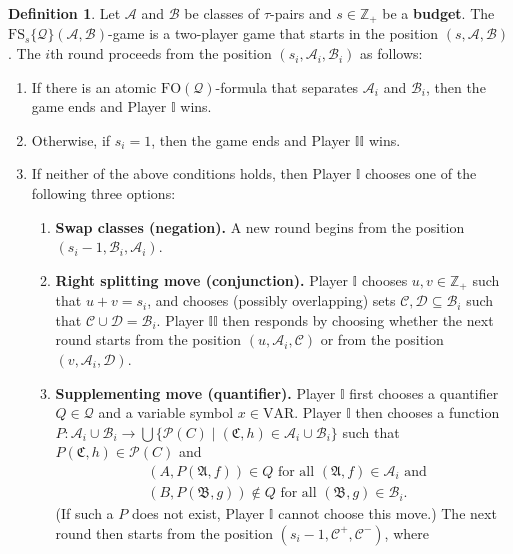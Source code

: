 \documentclass{article}
\theoremstyle{definition}
\newtheorem{definition}[theorem]{Definition}
\begin{document}
\begin{definition}
    Let $\mathcal{A}$ and $\mathcal{B}$ be classes of $\tau$-pairs and $s \in \mathbb{Z}_+$ be a \textbf{budget}. The $\mathrm{FS}_{s}\{\mathcal{Q}\}(\mathcal{A},\mathcal{B})$-game is a two-player game that starts in the position $(s,\mathcal{A},\mathcal{B})$. The $i$th round proceeds from the position $(s_i,\mathcal{A}_i,\mathcal{B}_i)$ as follows:
    \begin{enumerate}
        \item If there is an atomic $\mathrm{FO}(\mathcal{Q})$-formula that separates $\mathcal{A}_i$ and $\mathcal{B}_i$, then the game ends and Player $\mathbb{I}$ wins.
        \item Otherwise, if $s_i=1$, then the game ends and Player $\mathbb{II}$ wins.
        \item If neither of the above conditions holds, then Player $\mathbb{I}$ chooses one of the following three options:
        \begin{enumerate}
            \item \textbf{Swap classes (negation).} A new round begins from the position $(s_i-1,\mathcal{B}_i,\mathcal{A}_i)$.
            \item \textbf{Right splitting move (conjunction).} Player $\mathbb{I}$ chooses $u,v\in \mathbb{Z}_+$ such that $u+v=s_i$, and chooses (possibly overlapping) sets $\mathcal{C},\mathcal{D}\subseteq \mathcal{B}_i$ such that $\mathcal{C}\cup\mathcal{D}=\mathcal{B}_i$. Player $\mathbb{II}$ then responds by choosing whether the next round starts from the position $(u,\mathcal{A}_i,\mathcal{C})$ or from the position $(v,\mathcal{A}_i,\mathcal{D})$.
            \item \textbf{Supplementing move (quantifier).} Player $\mathbb{I}$ first chooses a quantifier $Q \in \mathcal{Q}$ and a variable symbol $x\in \text{VAR}$. Player $\mathbb{I}$ then chooses a function $P:\mathcal{A}_i\cup\mathcal{B}_i\rightarrow \bigcup\{\mathcal{P}(C)\mid (\mathfrak{C},h)\in\mathcal{A}_i\cup\mathcal{B}_i\}$ such that $P(\mathfrak{C},h)\in \mathcal{P}(C)$ and 
            \begin{align*}
                &(A,P(\mathfrak{A},f))\in Q \text{ for all } (\mathfrak{A},f)\in \mathcal{A}_i\text{ and }\\
                &(B,P(\mathfrak{B},g))\notin Q \text{ for all }(\mathfrak{B},g)\in \mathcal{B}_i.
            \end{align*}
            (If such a $P$ does not exist, Player $\mathbb{I}$ cannot choose this move.) The next round then starts from the position $(s_i-1,\mathcal{C}^+,\mathcal{C}^-)$, where

\end{enumerate}
\end{enumerate}
\end{definition}
\end{document}
